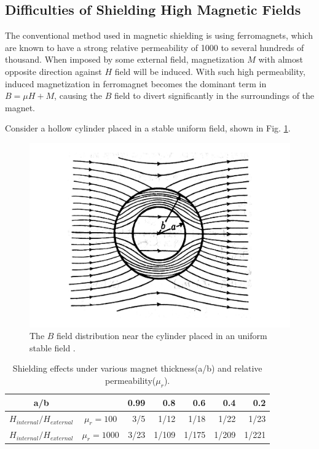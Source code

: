 \newpage
\subsection{Difficulties of Shielding High Magnetic Fields}
The conventional method used in magnetic shielding is using ferromagnets,
which are known to have a strong relative permeability of 1000 to several hundreds of thousand.
When imposed by some external field, magnetization $M$ with almost opposite direction against $H$ field will be induced.
With such high permeability, induced magnetization in ferromagnet becomes the dominant term in $B = \mu H + M$,
causing the $B$ field to divert significantly in the surroundings of the magnet.

Consider a hollow cylinder placed in a stable uniform field, shown in Fig. \ref{fig:FM}.
\begin{figure}[H]
  \includegraphics[width=18cm, bb=9 9 900 600]{./section1Introduction/FM.pdf}
  \caption{The $B$ field distribution near the cylinder placed in an uniform stable field \cite{1_1_7}.}
  \label{fig:FM}
\end{figure}
\begin{table}[H]
  \centering
  \caption{Shielding effects under various magnet thickness(a/b) and relative permeability($\mu_r$).}
  \label{tab:FM}
  \begin{tabular}{cc|rrrrr}\hline\hline
    a/b &  & 0.99 & 0.8 & 0.6 & 0.4 & 0.2\\\hline
    $H_{internal}/H_{external}$ & $\mu_r = 100$ & 3/5 & 1/12 & 1/18 & 1/22 & 1/23 \\
    $H_{internal}/H_{external}$ & $\mu_r = 1000$ & 3/23 & 1/109 & 1/175 & 1/209 & 1/221 \\\hline\hline
  \end{tabular}
\end{table}
